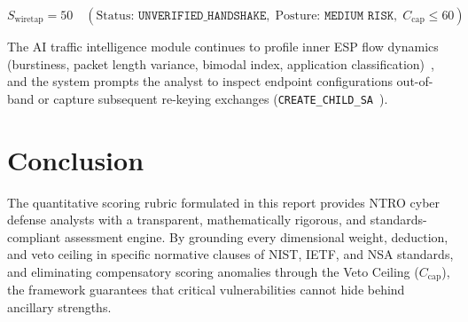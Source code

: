 \documentclass[11pt,a4paper]{article}
\begin{document}
\begin{equation}
S_{\text{wiretap}} = 50 \quad (\text{Status: } \texttt{UNVERIFIED\_HANDSHAKE}, \; \text{Posture: } \texttt{MEDIUM RISK}, \; C_{\text{cap}} \le 60)
\end{equation}

The AI traffic intelligence module continues to profile inner ESP flow dynamics (burstiness, packet length variance, bimodal index, application classification)~\cite{rfc4303}, and the system prompts the analyst to inspect endpoint configurations out-of-band or capture subsequent re-keying exchanges (\texttt{CREATE\_CHILD\_SA}~\cite{rfc7296}).

\section{Conclusion}
The quantitative scoring rubric formulated in this report provides NTRO cyber defense analysts with a transparent, mathematically rigorous, and standards-compliant assessment engine. By grounding every dimensional weight, deduction, and veto ceiling in specific normative clauses of NIST, IETF, and NSA standards, and eliminating compensatory scoring anomalies through the Veto Ceiling ($C_{\text{cap}}$), the framework guarantees that critical vulnerabilities cannot hide behind ancillary strengths.
\end{document}
